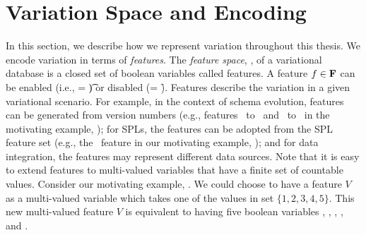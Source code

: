 \section{Variation Space and Encoding}
\label{sec:varspace}



In this section, we describe how we represent variation throughout this 
thesis. 
We encode variation in terms of \emph{features}.
%
The \emph{feature space}, \fSet, of a variational database
is a closed set of boolean variables called features.
%
A feature \ensuremath{\fName \in \fSet} can be enabled (i.e., \fName = \t) or disabled (\fName = \f).
Features describe the variation in a given variational scenario.
%
%
For example, in the context of schema evolution, features can be generated from version 
numbers (e.g., features \vOne\ to \vFive\ and \tOne\ to \tFive\ in the 
motivating example, ); for SPLs, 
the features can be adopted from the SPL feature set (e.g., the \edu\ feature in
our motivating example, ); and 
for data integration, the features may represent different data sources.  
Note that it is easy to extend features
to multi-valued variables that have a finite set of countable values.
Consider our motivating example, . We could choose to have a feature $V$
as a multi-valued variable which takes one of the values in set $\{1, 2, 3, 4, 5\}$. 
This new multi-valued feature $V$ is equivalent to having five boolean variables 
\vOne, \vTwo, \vThree, \vFour, and \vFive. 


